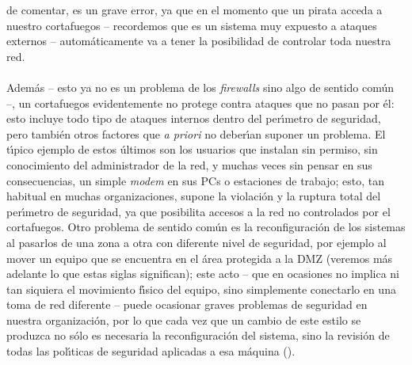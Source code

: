 de comentar, es un grave error, ya que en el momento que un pirata acceda a
nuestro cortafuegos -- recordemos que es un sistema muy expuesto a ataques
externos -- autom\'aticamente va a tener la posibilidad de controlar toda 
nuestra red.\\
\\Adem\'as -- esto ya no es un problema de los {\it firewalls} sino
algo de sentido com\'un --, un cortafuegos evidentemente no protege contra 
ataques que no pasan por \'el: esto incluye todo tipo de ataques internos dentro
del per\'{\i}metro de seguridad, pero tambi\'en otros factores que {\it a
priori} no deber\'{\i}an suponer un problema. El t\'{\i}pico ejemplo de estos
\'ultimos son los usuarios que instalan sin permiso, sin conocimiento del 
administrador de la red, y muchas veces sin pensar en sus consecuencias, un
simple {\it modem} en sus PCs o estaciones de trabajo; esto, tan habitual en
muchas organizaciones, supone la violaci\'on y la ruptura total del 
per\'{\i}metro de seguridad, ya que posibilita accesos a la red no controlados
por el cortafuegos. Otro problema de sentido com\'un es la reconfiguraci\'on
de los sistemas al pasarlos de una zona a otra con diferente nivel de seguridad,
por ejemplo al mover un equipo que se encuentra en el \'area protegida a la
DMZ (veremos m\'as adelante lo que estas siglas significan); este acto -- que
en ocasiones no implica ni tan siquiera el movimiento f\'{\i}sico del equipo, 
sino simplemente conectarlo en una toma de red diferente -- puede ocasionar
graves problemas de seguridad en nuestra organizaci\'on, por lo que cada vez que
un cambio de este estilo se produzca no s\'olo es necesaria la reconfiguraci\'on
del sistema, sino la revisi\'on de todas las pol\'{\i}ticas de seguridad
aplicadas a esa m\'aquina (\cite{kn:mel97}).
